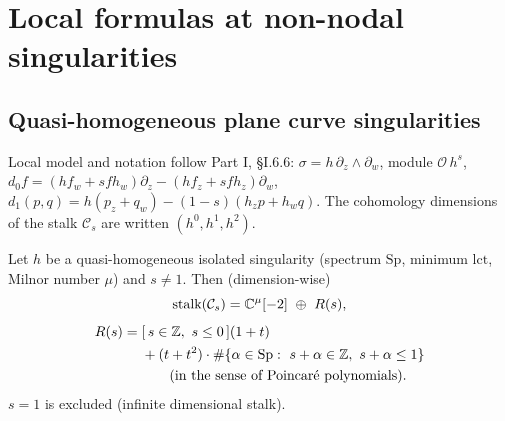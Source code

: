 \section{Local formulas at non-nodal singularities}\label{p2:sec:local2}
\subsection{Quasi-homogeneous plane curve singularities}
Local model and notation follow Part I, \S I.6.6: $\sigma=h\,\partial_z\wedge\partial_w$, module $\mathcal O\,h^s$, $d_0f=(hf_w+sfh_w)\partial_z-(hf_z+sfh_z)\partial_w$, $d_1(p,q)=h(p_z+q_w)-(1-s)(h_zp+h_wq)$. The cohomology dimensions of the stalk $\mathcal C_s$ are written $(h^0,h^1,h^2)$.

\begin{obs}\label{p2:obs:stalk}
Let $h$ be a quasi-homogeneous isolated singularity (spectrum $\mathrm{Sp}$, minimum $\mathrm{lct}$, Milnor number $\mu$) and $s\ne1$. Then (dimension-wise)
\[\text{stalk}(\mathcal C_s)=\mathbb C^{\mu}[-2]\ \oplus\ R(s),\]
\[\begin{split}R(s)={}&[\,s\in\Z,\ s\le0\,](1+t)\\&+(t+t^2)\cdot\#\{\alpha\in\mathrm{Sp}:\ s+\alpha\in\Z,\ s+\alpha\le1\}\\&\hspace{2em}(\text{in the sense of Poincar\'e polynomials}).\end{split}\]
$s=1$ is excluded (infinite dimensional stalk).
\end{obs}
